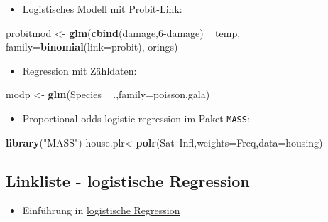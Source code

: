 \documentclass[]{article}
\newenvironment{Shaded}{\begin{snugshade}}{\end{snugshade}}
\newcommand{\KeywordTok}[1]{\textcolor[rgb]{0.13,0.29,0.53}{\textbf{{#1}}}}
\newcommand{\DataTypeTok}[1]{\textcolor[rgb]{0.13,0.29,0.53}{{#1}}}
\newcommand{\DecValTok}[1]{\textcolor[rgb]{0.00,0.00,0.81}{{#1}}}
\newcommand{\StringTok}[1]{\textcolor[rgb]{0.31,0.60,0.02}{{#1}}}
\newcommand{\NormalTok}[1]{{#1}}
\providecommand{\tightlist}{%
  \setlength{\itemsep}{0pt}\setlength{\parskip}{0pt}}
\begin{document}
\begin{itemize}
\tightlist
\item
  Logistisches Modell mit Probit-Link:
\end{itemize}

\begin{Shaded}
\begin{Highlighting}[]
\NormalTok{probitmod <-}\StringTok{ }\KeywordTok{glm}\NormalTok{(}\KeywordTok{cbind}\NormalTok{(damage,}\DecValTok{6}\NormalTok{-damage) ~}\StringTok{ }\NormalTok{temp, }
    \DataTypeTok{family=}\KeywordTok{binomial}\NormalTok{(}\DataTypeTok{link=}\NormalTok{probit), orings)}
\end{Highlighting}
\end{Shaded}

\begin{itemize}
\tightlist
\item
  Regression mit Zähldaten:
\end{itemize}

\begin{Shaded}
\begin{Highlighting}[]
\NormalTok{modp <-}\StringTok{ }\KeywordTok{glm}\NormalTok{(Species ~}\StringTok{ }\NormalTok{.,}\DataTypeTok{family=}\NormalTok{poisson,gala)}
\end{Highlighting}
\end{Shaded}

\begin{itemize}
\tightlist
\item
  Proportional odds logistic regression im Paket \texttt{MASS}:
\end{itemize}

\begin{Shaded}
\begin{Highlighting}[]
\KeywordTok{library}\NormalTok{(}\StringTok{"MASS"}\NormalTok{)}
\NormalTok{house.plr<-}\KeywordTok{polr}\NormalTok{(Sat~Infl,}\DataTypeTok{weights=}\NormalTok{Freq,}\DataTypeTok{data=}\NormalTok{housing)}
\end{Highlighting}
\end{Shaded}

\subsection{Linkliste - logistische
Regression}\label{linkliste---logistische-regression}

\begin{itemize}
\tightlist
\item
  Einführung in
  \href{http://ww2.coastal.edu/kingw/statistics/R-tutorials/logistic.html}{logistische
  Regression}
\end{itemize}
\end{document}
